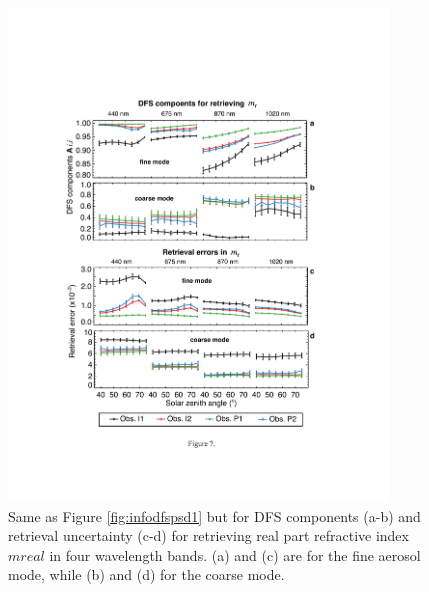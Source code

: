 \begin{figure}[p]
  \centering
  \includegraphics[width={0.9\textwidth}]{figures/info07.pdf}
  \caption{Same as Figure \ref{fig:infodfspsd1} but for DFS components (a-b) and 
retrieval uncertainty (c-d) for retrieving real part refractive index $mreal$ 
in four wavelength bands. (a) and (c) are for the fine aerosol mode, while 
(b) and (d) for the coarse mode. }
  \label{fig:infodfsmr}
\end{figure}

